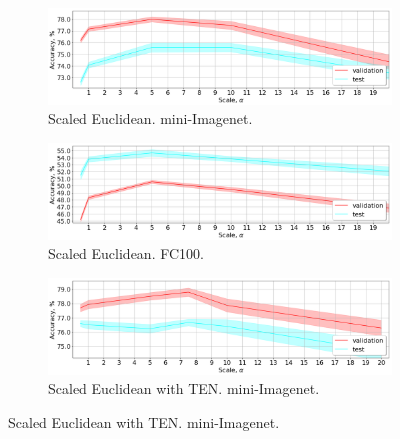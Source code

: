 \documentclass{article}
\begin{document}
\begin{figure}[t]
%

    \centering
    \begin{subfigure}[t]{0.49\textwidth}
        \includegraphics[width=\textwidth]{scale_crossvalidation_polynomial_MIN.png}
        \caption{Scaled Euclidean. mini-Imagenet.}
        \label{fig:scaled_euclidean_miniimagenet}
    \end{subfigure}
    \begin{subfigure}[t]{0.49\textwidth}
        \includegraphics[width=\textwidth]{scale_crossvalidation_polynomial_CIFAR100.png}
        \caption{Scaled Euclidean. FC100.}
        \label{fig:scaled_euclidean_cifar100}
    \end{subfigure}
    \begin{subfigure}[t]{0.49\textwidth}
        \includegraphics[width=\textwidth]{scale_crossvalidation_cbn_MIN.png}
        \caption{Scaled Euclidean with TEN. mini-Imagenet.}
        \label{fig:scaled_euclidean_with_tbn_miniimagenet}
    \end{subfigure}

\end{figure}
\end{document}
